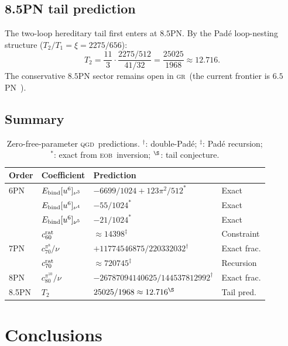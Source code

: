 \documentclass[twocolumn,aps,prd,showpacs,superscriptaddress,floatfix]{revtex4-2}
\newcommand{\pn}[1]{$#1$PN}
\newcommand{\QGD}{\textsc{qgd}}
\newcommand{\EOB}{\textsc{eob}}
\newcommand{\GR}{\textsc{gr}}
\begin{document}
\subsection{8.5PN tail prediction}

The two-loop hereditary tail first enters at \pn{8.5}.
By the Pad\'e loop-nesting structure ($T_2/T_1=\xi=2275/656$):
\begin{equation}
  T_2 = \frac{11}{3}\cdot\frac{2275/512}{41/32}
      = \frac{25025}{1968}\approx12.716.
  \label{eq:T2}
\end{equation}
The conservative \pn{8.5} sector remains open in \GR\ (the current
frontier is \pn{6.5}~\cite{Bini:2024iti}).

\subsection{Summary}

\begin{table}[ht]
\centering
\caption{Zero-free-parameter \QGD\ predictions.
  $^\dagger$: double-Pad\'e; $^\ddagger$: Pad\'e recursion;
  $^\ast$: exact from \EOB\ inversion; $^\S$: tail conjecture.}
\label{tab:pred}
\begin{tabular}{llll}
\toprule
Order & Coefficient & Prediction & \\
\midrule
6PN & $E_{\rm bind}[u^6]_{\nu^3}$
    & $-6699/1024+123\pi^2/512^\ast$ & Exact \\
    & $E_{\rm bind}[u^6]_{\nu^4}$
    & $-55/1024^\ast$ & Exact \\
    & $E_{\rm bind}[u^6]_{\nu^5}$
    & $-21/1024^\ast$ & Exact \\
    & $c_{60}^{\rm rat}$
    & $\approx14398^\ddagger$ & Constraint \\
\midrule
7PN & $c_{70}^{\pi^8}/\nu$
    & $+11774546875/220332032^\dagger$ & Exact frac. \\
    & $c_{70}^{\rm rat}$
    & $\approx720745^\ddagger$ & Recursion \\
\midrule
8PN & $c_{80}^{\pi^{10}}/\nu$
    & $-26787094140625/144537812992^\dagger$ & Exact frac. \\
\midrule
8.5PN & $T_2$ & $25025/1968\approx12.716^\S$ & Tail pred. \\
\bottomrule
\end{tabular}
\end{table}

\section{Conclusions}
\label{sec:conc}
\end{document}
